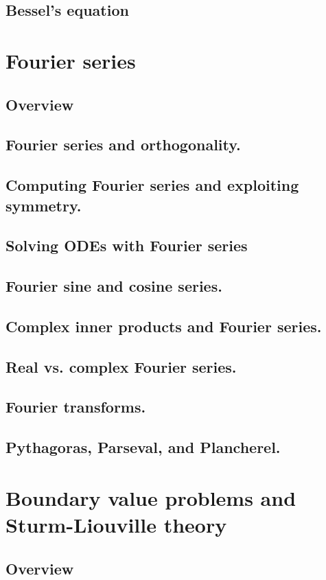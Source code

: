 \documentclass{article}
\begin{document}
\subsection{Bessel's equation}
\pagebreak
\section{Fourier series}
\subsection*{Overview}
\subsection{Fourier series and orthogonality.}
\subsection{Computing Fourier series and exploiting symmetry.}
\subsection{Solving ODEs with Fourier series}
\subsection{Fourier sine and cosine series.}
\subsection{Complex inner products and Fourier series.}
\subsection{Real vs. complex Fourier series.}
\subsection{Fourier transforms.}
\subsection{Pythagoras, Parseval, and Plancherel.}
\pagebreak
\section{Boundary value problems and Sturm-Liouville theory}
\subsection*{Overview}
\end{document}

